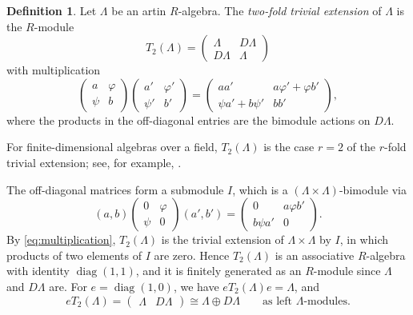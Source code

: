\documentclass[a4paper,reqno,10pt]{amsart}
\theoremstyle{definition}
\newtheorem{definition}[theorem]{Definition}
\numberwithin{equation}{section}
\begin{document}
\begin{definition}\label{def:two-fold}
Let $\Lambda$ be an artin $R$-algebra.  The \emph{two-fold trivial extension}
of $\Lambda$ is the $R$-module
\begin{equation}\label{eq:extension}
 T_2(\Lambda)=
 \begin{pmatrix}\Lambda&D\Lambda\\D\Lambda&\Lambda\end{pmatrix}
\end{equation}
with multiplication
\begin{equation}\label{eq:multiplication}
 \begin{pmatrix}a&\varphi\\\psi&b\end{pmatrix}
 \begin{pmatrix}a'&\varphi'\\\psi'&b'\end{pmatrix}
 =
 \begin{pmatrix}
 aa'&a\varphi'+\varphi b'\\
 \psi a'+b\psi'&bb'
 \end{pmatrix},
\end{equation}
where the products in the off-diagonal entries are the bimodule actions on
$D\Lambda$.
\end{definition}

For finite-dimensional algebras over a field, $T_2(\Lambda)$ is the case
$r=2$ of the $r$-fold trivial extension; see, for example,
\cite[\S2.2]{CDIM}.

The off-diagonal matrices form a submodule $I$, which is a
$(\Lambda\times\Lambda)$-bimodule via
\[
 (a,b)\begin{pmatrix}0&\varphi\\\psi&0\end{pmatrix}(a',b')
 =\begin{pmatrix}0&a\varphi b'\\b\psi a'&0\end{pmatrix}.
\]
By \eqref{eq:multiplication}, $T_2(\Lambda)$ is the trivial extension of
$\Lambda\times\Lambda$ by $I$, in which products of two elements of $I$ are
zero.  Hence $T_2(\Lambda)$ is an associative $R$-algebra with identity
$\operatorname{diag}(1,1)$, and it is finitely generated as an $R$-module
since $\Lambda$ and $D\Lambda$ are.  For $e=\operatorname{diag}(1,0)$, we have
$eT_2(\Lambda)e=\Lambda$, and
\begin{equation}\label{eq:eGamma}
 eT_2(\Lambda)=\begin{pmatrix}\Lambda&D\Lambda\end{pmatrix}
 \cong\Lambda\oplus D\Lambda
 \qquad\text{as left }\Lambda\text{-modules.}
\end{equation}
\end{document}
